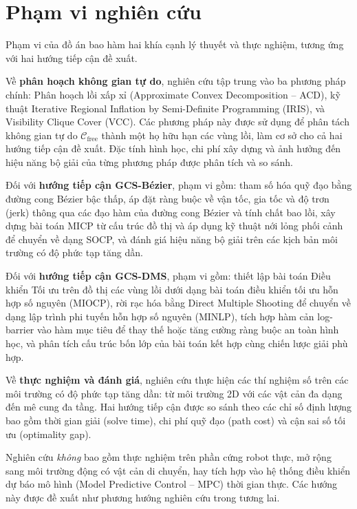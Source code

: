 \section{Phạm vi nghiên cứu}

Phạm vi của đồ án bao hàm hai khía cạnh lý thuyết và thực nghiệm, tương ứng với hai hướng tiếp cận đề xuất.

Về \textbf{phân hoạch không gian tự do}, nghiên cứu tập trung vào ba phương pháp chính:
Phân hoạch lồi xấp xỉ (Approximate Convex Decomposition -- ACD),
kỹ thuật Iterative Regional Inflation by Semi-Definite Programming (IRIS),
và Visibility Clique Cover (VCC).
Các phương pháp này được sử dụng để phân tách không gian tự do $\mathcal{C}_{\mathrm{free}}$ thành một họ hữu hạn các vùng lồi, làm cơ sở cho cả hai hướng tiếp cận đề xuất.
Đặc tính hình học, chi phí xây dựng và ảnh hưởng đến hiệu năng bộ giải của từng phương pháp được phân tích và so sánh.

Đối với \textbf{hướng tiếp cận GCS-Bézier}, phạm vi gồm:
tham số hóa quỹ đạo bằng đường cong Bézier bậc thấp,
áp đặt ràng buộc về vận tốc, gia tốc và độ trơn (jerk) thông qua các đạo hàm của đường cong Bézier và tính chất bao lồi,
xây dựng bài toán MICP từ cấu trúc đồ thị và áp dụng kỹ thuật nới lỏng phối cảnh để chuyển về dạng SOCP,
và đánh giá hiệu năng bộ giải trên các kịch bản môi trường có độ phức tạp tăng dần.

Đối với \textbf{hướng tiếp cận GCS-DMS}, phạm vi gồm:
thiết lập bài toán Điều khiển Tối ưu trên đồ thị các vùng lồi dưới dạng bài toán điều khiển tối ưu hỗn hợp số nguyên (MIOCP),
rời rạc hóa bằng Direct Multiple Shooting để chuyển về dạng lập trình phi tuyến hỗn hợp số nguyên (MINLP),
tích hợp hàm cản log-barrier vào hàm mục tiêu để thay thế hoặc tăng cường ràng buộc an toàn hình học,
và phân tích cấu trúc bốn lớp của bài toán kết hợp cùng chiến lược giải phù hợp.

Về \textbf{thực nghiệm và đánh giá}, nghiên cứu thực hiện các thí nghiệm số trên các môi trường có độ phức tạp tăng dần: từ môi trường 2D với các vật cản đa dạng đến mê cung đa tầng. Hai hướng tiếp cận được so sánh theo các chỉ số định lượng bao gồm thời gian giải (solve time), chi phí quỹ đạo (path cost) và cận sai số tối ưu (optimality gap).

Nghiên cứu \emph{không} bao gồm thực nghiệm trên phần cứng robot thực, mở rộng sang môi trường động có vật cản di chuyển, hay tích hợp vào hệ thống điều khiển dự báo mô hình (Model Predictive Control -- MPC) thời gian thực.
Các hướng này được đề xuất như phương hướng nghiên cứu trong tương lai.
